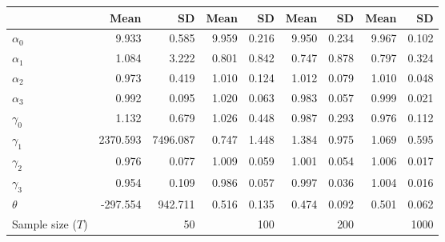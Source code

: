 
\begin{tabular}[t]{lrrrrrrrr}
\toprule
  & Mean & SD & Mean  & SD  & Mean   & SD   & Mean    & SD   \\
\midrule
$\alpha_{0}$ & 9.933 & 0.585 & 9.959 & 0.216 & 9.950 & 0.234 & 9.967 & 0.102\\
$\alpha_{1}$ & 1.084 & 3.222 & 0.801 & 0.842 & 0.747 & 0.878 & 0.797 & 0.324\\
$\alpha_{2}$ & 0.973 & 0.419 & 1.010 & 0.124 & 1.012 & 0.079 & 1.010 & 0.048\\
$\alpha_{3}$ & 0.992 & 0.095 & 1.020 & 0.063 & 0.983 & 0.057 & 0.999 & 0.021\\
$\gamma_{0}$ & 1.132 & 0.679 & 1.026 & 0.448 & 0.987 & 0.293 & 0.976 & 0.112\\
$\gamma_{1}$ & 2370.593 & 7496.087 & 0.747 & 1.448 & 1.384 & 0.975 & 1.069 & 0.595\\
$\gamma_{2}$ & 0.976 & 0.077 & 1.009 & 0.059 & 1.001 & 0.054 & 1.006 & 0.017\\
$\gamma_{3}$ & 0.954 & 0.109 & 0.986 & 0.057 & 0.997 & 0.036 & 1.004 & 0.016\\
$\theta$ & -297.554 & 942.711 & 0.516 & 0.135 & 0.474 & 0.092 & 0.501 & 0.062\\
Sample size ($T$) &  & 50 &  & 100 &  & 200 &  & 1000\\
\bottomrule
\end{tabular}

